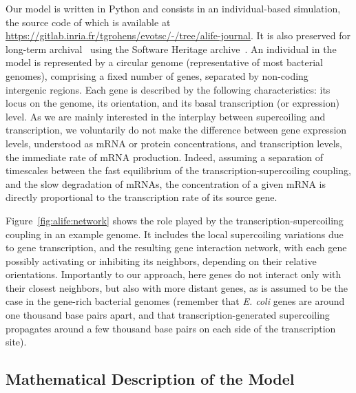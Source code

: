 
Our model is written in Python and consists in an individual-based simulation, the source code of which is available at
\url{https://gitlab.inria.fr/tgrohens/evotsc/-/tree/alife-journal}.
It is also preserved for long-term archival~\citep{evotsc_swh} using the Software Heritage archive~\citep{dicosmo2020}.
An individual in the model is represented by a circular genome (representative of most bacterial genomes), comprising a fixed number of genes, separated by non-coding intergenic regions.
Each gene is described by the following characteristics: its locus on the genome, its orientation, and its basal transcription (or expression) level.
As we are mainly interested in the interplay between supercoiling and transcription, we voluntarily do not make the difference between gene expression levels, understood as mRNA or protein concentrations, and transcription levels, the immediate rate of mRNA
production.
Indeed, assuming a separation of timescales between the fast equilibrium of the transcription-supercoiling coupling, and the slow degradation of mRNAs, the concentration of a given mRNA is directly proportional to the transcription rate of its source gene.

Figure~\ref{fig:alife:network} shows the role played by the transcription-supercoiling coupling in an example genome.
It includes the local supercoiling variations due to gene transcription, and the resulting gene interaction network, with each gene possibly activating or inhibiting its neighbors, depending on their relative orientations.
Importantly to our approach, here genes do not interact only with their closest neighbors, but also with more distant genes, as is assumed to be the case in the gene-rich bacterial genomes (remember that \emph{E. coli} genes are around one thousand base pairs apart, and that transcription-generated supercoiling propagates around a few thousand base pairs on each side of the transcription site).


\subsection{Mathematical Description of the Model}

